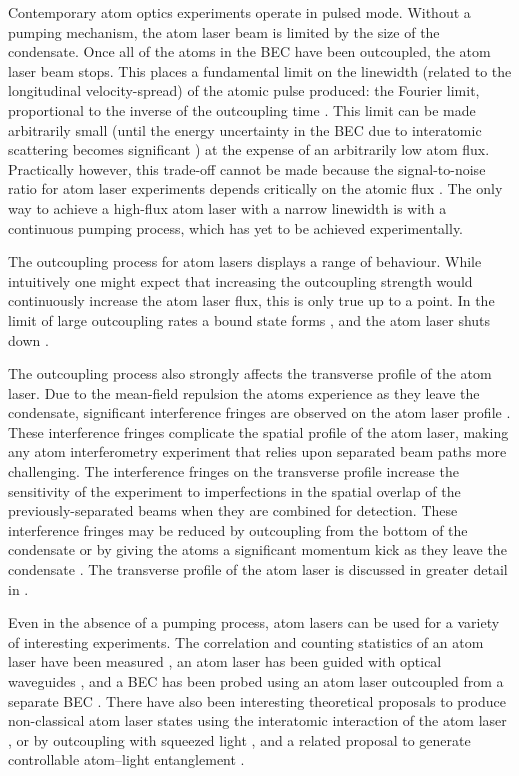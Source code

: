 Contemporary atom optics experiments operate in pulsed mode.  Without a pumping mechanism, the atom laser beam is limited by the size of the condensate.  Once all of the atoms in the BEC have been outcoupled, the atom laser beam stops.  This places a fundamental limit on the linewidth (related to the longitudinal velocity-spread) of the atomic pulse produced: the Fourier limit, proportional to the inverse of the outcoupling time \citep{Johnsson:2007}.  This limit can be made arbitrarily small (until the energy uncertainty in the BEC due to interatomic scattering becomes significant \cite{Johnsson:2007a}) at the expense of an arbitrarily low atom flux.  Practically however, this trade-off cannot be made because the signal-to-noise ratio for atom laser experiments depends critically on the atomic flux \citep{Dowling:1998}.  The only way to achieve a high-flux atom laser with a narrow linewidth is with a continuous pumping process, which has yet to be achieved experimentally. 

The outcoupling process for atom lasers displays a range of behaviour.  While intuitively one might expect that increasing the outcoupling strength would continuously increase the atom laser flux, this is only true up to a point.  In the limit of large outcoupling rates a bound state forms \citep{Jeffers:2000rr}, and the atom laser shuts down \citep{Robins:2004pz}.  

The outcoupling process also strongly affects the transverse profile of the atom laser.  Due to the mean-field repulsion the atoms experience as they leave the condensate, significant interference fringes are observed on the atom laser profile \citep{Busch:2002zr,Kohl:2005fk}.  These interference fringes complicate the spatial profile of the atom laser, making any atom interferometry experiment that relies upon separated beam paths more challenging.  The interference fringes on the transverse profile increase the sensitivity of the experiment to imperfections in the spatial overlap of the previously-separated beams when they are combined for detection.  These interference fringes may be reduced by outcoupling from the bottom of the condensate \citep{Riou:2006uq} or by giving the atoms a significant momentum kick as they leave the condensate \citep{Jeppesen:2008}.  The transverse profile of the atom laser is discussed in greater detail in .

Even in the absence of a pumping process, atom lasers can be used for a variety of interesting experiments.  The correlation and counting statistics of an atom laser have been measured \citep{Ottl:2005}, an atom laser has been guided with optical waveguides \citep{Guerin:2006mz}, and a BEC has been probed using an atom laser outcoupled from a separate BEC \citep{Doring:2008}.  There have also been interesting theoretical proposals to produce non-classical atom laser states using the interatomic interaction of the atom laser \citep{Johnsson:2007b}, or by outcoupling with squeezed light \citep{Haine:2005}, and a related proposal to generate controllable atom--light entanglement \citep{Haine:2006}.

